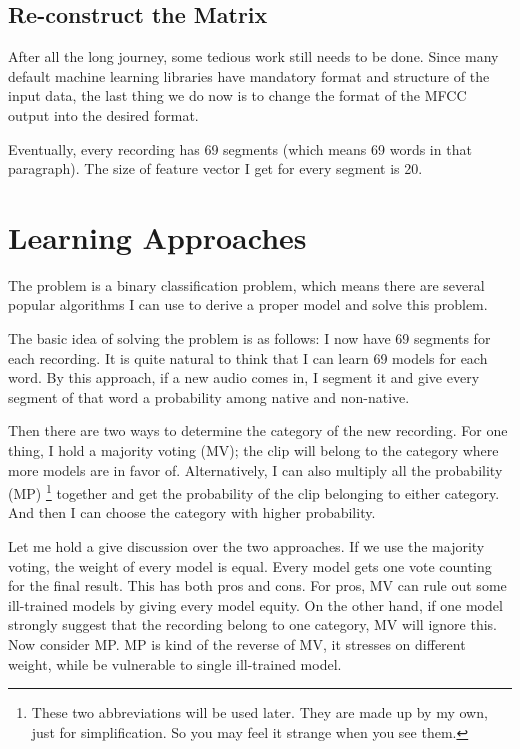 \documentclass{sig-alternate}
\begin{document}
\subsection{Re-construct the Matrix}
After all the long journey, some tedious work still needs to be done. Since many default machine learning libraries have mandatory format and structure of the input data, the last thing we do now is to change the format of the MFCC output into the desired format.

Eventually, every recording has 69 segments (which means 69 words in that paragraph). The size of feature vector I get for every segment is 20.




\section{Learning Approaches}
The problem is a binary classification problem, which means there are several popular algorithms I can use to derive a proper model and solve this problem.

The basic idea of solving the problem is as follows: I now have 69 segments for each recording. It is quite natural to think that I can learn 69 models for each word. By this approach, if a new audio comes in, I segment it and give every segment of that word a probability among native and non-native.

Then there are two ways to determine the category of the new recording. For one thing, I hold a majority voting (MV); the clip will belong to the category where more models are in favor of. Alternatively, I can also multiply all the probability (MP) \footnote{These two abbreviations will be used later. They are made up by my own, just for simplification. So you may feel it strange when you see them.}  together and get the probability of the clip belonging to either category. And then I can choose the category with higher probability.

Let me hold a give discussion over the two approaches. If we use the majority voting, the weight of every model is equal. Every model gets one vote counting for the final result. This has both pros and cons. For pros, MV can rule out some ill-trained models by giving every model equity. On the other hand, if one model strongly suggest that the recording belong to one category, MV will ignore this. Now consider MP. MP is kind of the reverse of MV, it stresses on different weight, while be vulnerable to single ill-trained model.
\end{document}
